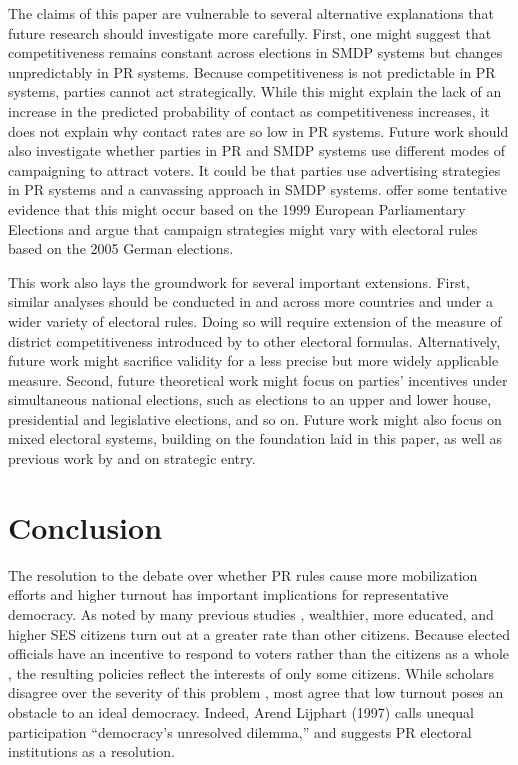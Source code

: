\documentclass[12pt]{article}
\begin{document}
The claims of this paper are vulnerable to several alternative explanations that future research should investigate more carefully. First, one might suggest that competitiveness remains constant across elections in SMDP systems but changes unpredictably in PR systems. Because competitiveness is not predictable in PR systems, parties cannot act strategically. While this might explain the lack of an increase in the predicted probability of contact as competitiveness increases, it does not explain why contact rates are so low in PR systems. Future work should also investigate whether parties in PR and SMDP systems use different modes of campaigning to attract voters. It could be that parties use advertising strategies in PR systems and a canvassing approach in SMDP systems. \cite{KarpBowlerBanducci2003} offer some tentative evidence that this might occur based on the 1999 European Parliamentary Elections and \cite{ZittelGschwend2008} argue that campaign strategies might vary with electoral rules based on the 2005 German elections.

This work also lays the groundwork for several important extensions. First, similar analyses should be conducted in and across more countries and under a wider variety of electoral rules. Doing so will require extension of the measure of district competitiveness introduced by \cite{GrofmanSelb2009} to other electoral formulas. Alternatively, future work might sacrifice validity for a less precise but more widely applicable measure. Second, future theoretical work might focus on parties' incentives under simultaneous national elections, such as elections to an upper and lower house, presidential and legislative elections, and so on. Future work might also focus on mixed electoral systems, building on the foundation laid in this paper, as well as previous work by \cite{FerraraHerron2005} and \cite{Ferrara2006} on strategic entry.

\section*{Conclusion}

The resolution to the debate over whether PR rules cause more mobilization efforts and higher turnout has important implications for representative democracy. As noted by many previous studies \citep{WolfingerRosenstone1980, RosenstoneHansen1993, BradyVerbaSchlozman1995}, wealthier, more educated, and higher SES citizens turn out at a greater rate than other citizens. Because elected officials have an incentive to respond to voters rather than the citizens as a whole \citep{Downs1957}, the resulting policies reflect the interests of only some citizens. While scholars disagree over the severity of this problem \citep{BerelsonLazarsfeldMcPhee1954, Lijphart1997, Teixeira1992}, most agree that low turnout poses an obstacle to an ideal democracy. Indeed, Arend Lijphart (1997) calls unequal participation ``democracy's unresolved dilemma,'' and suggests PR electoral institutions as a resolution.
\end{document}
